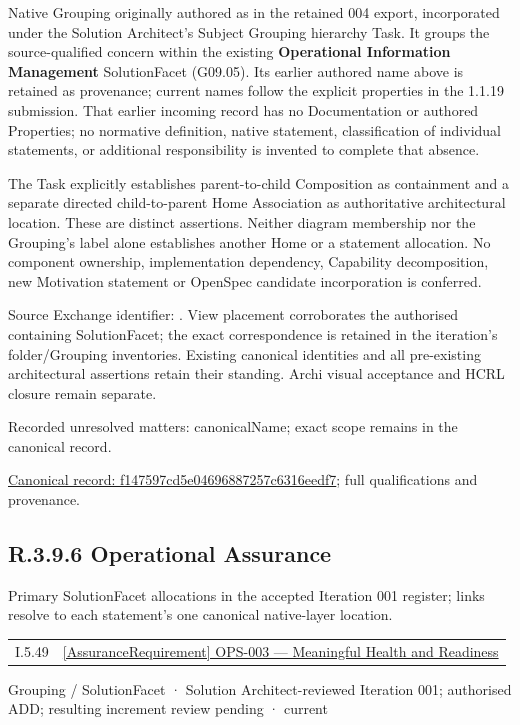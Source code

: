 Native Grouping originally authored as \texttt{} in the retained 004 export,
incorporated under the Solution Architect's Subject Grouping hierarchy Task.
It groups the source-qualified \texttt{} concern within
the existing \textbf{Operational Information Management} SolutionFacet (G09.05). Its earlier authored name above is retained as provenance; current names
follow the explicit properties in the 1.1.19 submission.
That earlier incoming record has no Documentation or authored Properties; no normative
definition, native statement, classification of individual statements, or
additional responsibility is invented to complete that absence.



The Task explicitly establishes parent-to-child Composition as containment and
a separate directed child-to-parent Home Association as authoritative architectural
location. These are distinct assertions. Neither diagram membership nor the
Grouping's label alone establishes another Home or a statement allocation.
No component ownership, implementation dependency, Capability decomposition,
new Motivation statement or OpenSpec candidate incorporation is conferred.



Source Exchange identifier: \texttt{}. View placement corroborates
the authorised containing SolutionFacet; the exact correspondence is retained in the
iteration's folder/Grouping inventories. Existing canonical identities and all
pre-existing architectural assertions retain their standing. Archi visual
acceptance and HCRL closure remain separate.


{\small Recorded unresolved matters: canonicalName; exact scope remains in the canonical record.}\par
{\footnotesize \href{../../../../../../../continuum/grouping/f147597cd5e04696887257c6316eedf7.md}{Canonical record: f147597cd5e04696887257c6316eedf7}; full qualifications and provenance.}\par
\subsection*{R.3.9.6 Operational Assurance}
\label{navigation:R.3.9.6}

Primary SolutionFacet allocations in the accepted Iteration 001 register; links resolve to each statement’s one canonical native-layer location.\par
\begin{longtable}{p{.22\linewidth}p{.73\linewidth}}
I.5.49 & \hyperref[element:4c02fec3af264b878ee3e0cfaecbf55f]{[AssuranceRequirement] OPS-003 — Meaningful Health and Readiness} \\
\end{longtable}
\label{element:315ba7bbe4624223a97a7e7e6d9cc252}
{\small Grouping / SolutionFacet · Solution Architect-reviewed Iteration 001; authorised ADD; resulting increment review pending · current}\par

